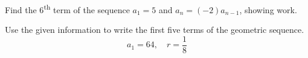 \documentclass[11pt,addpoints,answers]{exam}
\newcommand{\+}{\, \, + \, \, }
\renewcommand{\-}{\, \, - \, \, }
\renewcommand{\=}{\, \, = \, \, }
\begin{document}
\begin{questions}
\begin{parts}
\begin{multicols}{2}
\end{multicols}
\end{parts}

\vfill
\question[5] Find the 6\textsuperscript{th} term of the sequence $a_1 = 5$ and  $a_n  = (-2)a_{n-1}$, showing work.
\vspace*{.8in}
\begin{flushright}\end{flushright}
\pagestyle{empty}


\newpage

\question[10] Use the given information to write the first five terms of the geometric sequence.
\[a_1 = 64, \quad r = \frac{1}{8}\]
\vspace{0.25in}

\begin{multicols}{5}

\begin{flushright}\end{flushright}

\columnbreak

\begin{flushright}\end{flushright}

\columnbreak

\begin{flushright}\end{flushright}

\columnbreak

\begin{flushright}\end{flushright}


\end{multicols}
\end{questions}
\end{document}
